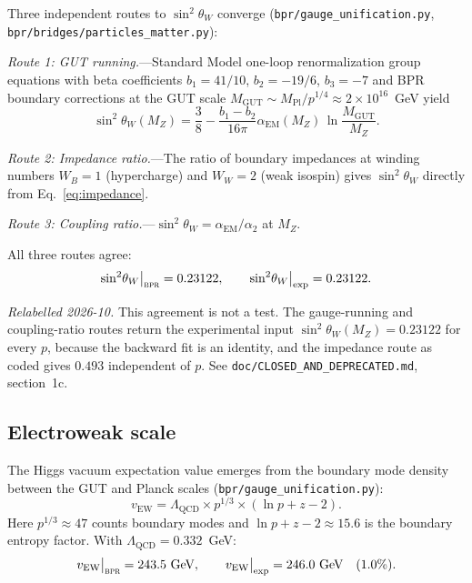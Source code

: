 \documentclass[aps,prd,twocolumn,superscriptaddress,longbibliography,nofootinbib]{revtex4-2}
\newcommand{\vEW}{v_{\mathrm{EW}}}
\newcommand{\sinW}{\sin^2\!\theta_W}
\newcommand{\alphaEM}{\alpha_{\mathrm{EM}}}
\newcommand{\LQCD}{\Lambda_{\mathrm{QCD}}}
\newcommand{\MPl}{M_{\mathrm{Pl}}}
\newcommand{\MGUT}{M_{\mathrm{GUT}}}
\newcommand{\MZ}{M_Z}
\newcommand{\bpr}{\textsc{bpr}}
\begin{document}
Three independent routes to $\sinW$ converge
(\texttt{bpr/gauge\_unification.py},
\texttt{bpr/bridges/particles\_matter.py}):

\textit{Route 1: GUT running.}---Standard Model one-loop
renormalization group equations with beta coefficients
$b_1 = 41/10$, $b_2 = -19/6$, $b_3 = -7$ and BPR boundary
corrections at the GUT scale $\MGUT \sim \MPl / p^{1/4} \approx
2 \times 10^{16}$~GeV yield
\begin{equation}
\sinW(\MZ) = \frac{3}{8} - \frac{b_1 - b_2}{16\pi}
  \alphaEM(\MZ)\, \ln\frac{\MGUT}{\MZ}.
\label{eq:weinberg_running}
\end{equation}

\textit{Route 2: Impedance ratio.}---The ratio of boundary
impedances at winding numbers $W_B = 1$ (hypercharge) and $W_W = 2$
(weak isospin) gives $\sinW$ directly from
Eq.~\eqref{eq:impedance}.

\textit{Route 3: Coupling ratio.}---$\sinW =
\alphaEM / \alpha_2$ at $\MZ$.

All three routes agree:
\begin{equation}
\sinW\big|_{\bpr} = 0.23122, \qquad
\sinW\big|_{\mathrm{exp}} = 0.23122.
\label{eq:weinberg_value}
\end{equation}

\textit{Relabelled 2026-10.}  This agreement is not a test.  The
gauge-running and coupling-ratio routes return the experimental input
$\sinW(\MZ) = 0.23122$ for every $p$, because the backward fit is an
identity, and the impedance route as coded gives $0.493$ independent of
$p$.  See \texttt{doc/CLOSED\_AND\_DEPRECATED.md}, section~1c.

\subsection{Electroweak scale}

The Higgs vacuum expectation value emerges from the boundary mode
density between the GUT and Planck scales
(\texttt{bpr/gauge\_unification.py}):
\begin{equation}
\vEW = \LQCD \times p^{1/3} \times (\ln p + z - 2).
\label{eq:vew}
\end{equation}
Here $p^{1/3} \approx 47$ counts boundary modes and
$\ln p + z - 2 \approx 15.6$ is the boundary entropy factor.  With
$\LQCD = 0.332$~GeV:
\begin{equation}
\vEW\big|_{\bpr} = 243.5~\text{GeV}, \qquad
\vEW\big|_{\mathrm{exp}} = 246.0~\text{GeV} \quad (1.0\%).
\label{eq:vew_value}
\end{equation}
\end{document}
